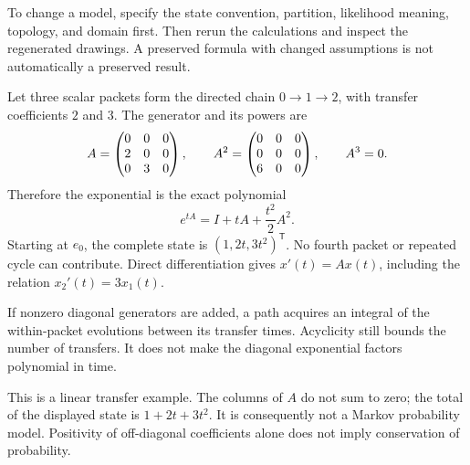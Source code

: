 To change a model, specify the state convention, partition, likelihood meaning, topology, and domain first. Then rerun the calculations and inspect the regenerated drawings. A preserved formula with changed assumptions is not automatically a preserved result.

Let three scalar packets form the directed chain $0\to1\to2$, with transfer coefficients $2$ and $3$. The generator and its powers are
\[
A=\begin{pmatrix}0&0&0\\2&0&0\\0&3&0\end{pmatrix},\qquad
A^2=\begin{pmatrix}0&0&0\\0&0&0\\6&0&0\end{pmatrix},\qquad A^3=0.
\]
Therefore the exponential is the exact polynomial
\[
e^{tA}=I+tA+\frac{t^2}{2}A^2.
\]
Starting at $e_0$, the complete state is $(1,2t,3t^2)^{\mathsf T}$. No fourth packet or repeated cycle can contribute. Direct differentiation gives $x'(t)=Ax(t)$, including the relation $x_2'(t)=3x_1(t)$.

If nonzero diagonal generators are added, a path acquires an integral of the within-packet evolutions between its transfer times. Acyclicity still bounds the number of transfers. It does not make the diagonal exponential factors polynomial in time.

This is a linear transfer example. The columns of $A$ do not sum to zero; the total of the displayed state is $1+2t+3t^2$. It is consequently not a Markov probability model. Positivity of off-diagonal coefficients alone does not imply conservation of probability.

